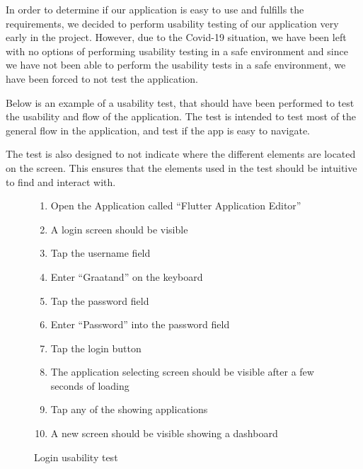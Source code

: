In order to determine if our application is easy to use and fulfills the requirements, we decided to perform usability testing of our application very early in the project.
However, due to the Covid-19 situation, we have been left with no options of performing usability testing in a safe environment and since we have not been able to perform the usability tests in a safe environment, we have been forced to not test the application.

Below is an example of a usability test, that should have been performed to test the usability and flow of the application. 
The test is intended to test most of the general flow in the application, and test if the app is easy to navigate. 

The test is also designed to not indicate where the different elements are located on the screen.
This ensures that the elements used in the test should be intuitive to find and interact with. 



\begin{figure}[H]
    \begin{enumerate}
        \item Open the Application called “Flutter Application Editor”
        \item A login screen should be visible
        \item Tap the username field
        \item Enter “Graatand” on the keyboard
        \item Tap the password field
        \item Enter “Password” into the password field
        \item Tap the login button
        \item The application selecting screen should be visible after a few seconds of loading
        \item Tap any of the showing applications
        \item A new screen should be visible showing a dashboard
    \end{enumerate}
    \caption{Login usability test}
    \label{loginUsabilityTest}
\end{figure}


